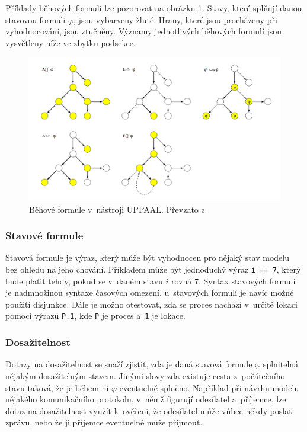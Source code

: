 Příklady běhových formulí lze pozorovat na obrázku \ref{fig:uppaal_path_form}. Stavy, které splňují danou stavovou formuli $\varphi$, jsou vybarveny žlutě. Hrany, které jsou procházeny při vyhodnocování, jsou ztučněny. Významy jednotlivých běhových formulí jsou vysvětleny níže ve zbytku podsekce.

\begin{figure}[H]
    \centering
    \includegraphics[width=\textwidth]{obrazky-figures/uppaal_path_form.png}
    \caption{Běhové formule v~nástroji UPPAAL. Převzato z~\cite{uppaal_intro}}
    \label{fig:uppaal_path_form}
\end{figure}

\subsubsection{Stavové formule}
Stavová formule je výraz, který může být vyhodnocen pro nějaký stav modelu bez ohledu na jeho chování. Příkladem může být jednoduchý výraz \texttt{i~== 7}, který bude platit tehdy, pokud se v~daném stavu $i$ rovná 7. Syntax stavových formulí je nadmnožinou syntaxe časových omezení, u~stavových formulí je navíc možné použití disjunkce. Dále je možno otestovat, zda se proces nachází v~určité lokaci pomocí výrazu \texttt{P.1}, kde \texttt{P} je proces a~\texttt{1} je lokace.

\subsubsection{Dosažitelnost}
Dotazy na dosažitelnost se snaží zjistit, zda je daná stavová formule $\varphi$ splnitelná nějakým dosažitelným stavem. Jinými slovy zda existuje cesta z~počátečního stavu taková, že je během ní $\varphi$ eventuelně splněno. Například při návrhu modelu nějakého komunikačního protokolu, v~němž figurují odesílatel a~příjemce, lze dotaz na dosažitelnost využít k~ověření, že odesílatel může vůbec někdy poslat zprávu, nebo že ji příjemce eventuelně může přijmout.

